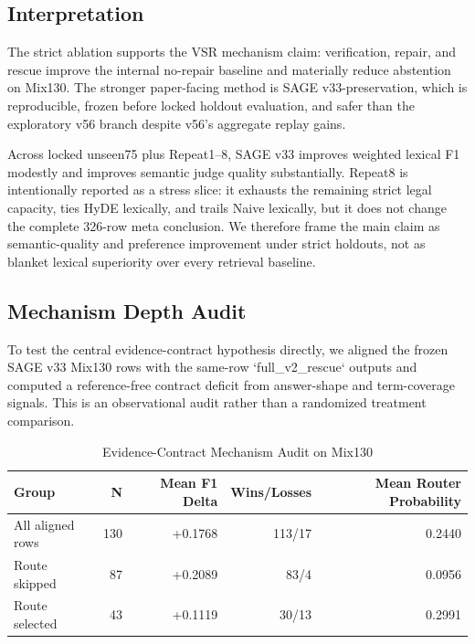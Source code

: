 \documentclass[journal,onecolumn,11pt]{IEEEtran}
\begin{document}


\subsection{Interpretation}

The strict ablation supports the VSR mechanism claim: verification, repair, and rescue improve the internal no-repair baseline and materially reduce abstention on Mix130. The stronger paper-facing method is SAGE v33-preservation, which is reproducible, frozen before locked holdout evaluation, and safer than the exploratory v56 branch despite v56's aggregate replay gains.

Across locked unseen75 plus Repeat1--8, SAGE v33 improves weighted lexical F1 modestly and improves semantic judge quality substantially. Repeat8 is intentionally reported as a stress slice: it exhausts the remaining strict legal capacity, ties HyDE lexically, and trails Naive lexically, but it does not change the complete 326-row meta conclusion. We therefore frame the main claim as semantic-quality and preference improvement under strict holdouts, not as blanket lexical superiority over every retrieval baseline.

\subsection{Mechanism Depth Audit}

To test the central evidence-contract hypothesis directly, we aligned the frozen SAGE v33 Mix130 rows with the same-row `full\_v2\_rescue` outputs and computed a reference-free contract deficit from answer-shape and term-coverage signals. This is an observational audit rather than a randomized treatment comparison.

\begin{table}[htbp]
\caption{Evidence-Contract Mechanism Audit on Mix130}
\label{tab:contract-depth}
\centering
\begin{tabular}{lrrrr}
\toprule
Group & N & Mean F1 Delta & Wins/Losses & Mean Router Probability \\
\midrule
All aligned rows & 130 & +0.1768 & 113/17 & 0.2440 \\
Route skipped & 87 & +0.2089 & 83/4 & 0.0956 \\
Route selected & 43 & +0.1119 & 30/13 & 0.2991 \\
\bottomrule
\end{tabular}
\end{table}
\end{document}
